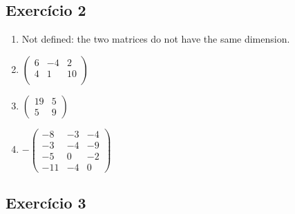 \subsection*{Exercício 2}
\begin{enumerate}
\item Not defined: the two matrices do not have the same dimension.
\item $\begin{pmatrix}
  6 & -4 & 2 \\
  4 & 1 & 10 \\
\end{pmatrix}$
\item $\begin{pmatrix}
  19 & 5 \\
  5 & 9
\end{pmatrix}$
\item $-\begin{pmatrix}
  -8 & -3 & -4 \\
  -3 & -4 & -9 \\
  -5 & 0 & -2 \\
  -11 & -4 & 0
\end{pmatrix}$

\end{enumerate}

\subsection*{Exercício 3}

